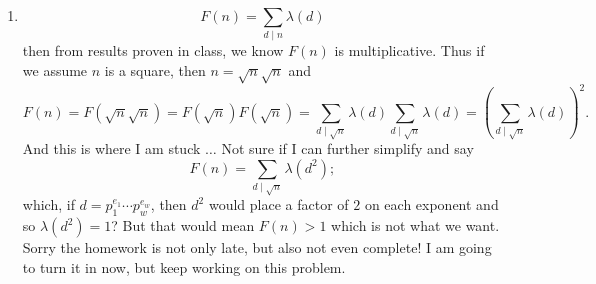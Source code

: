 \documentclass[12pt]{article}
\makeatletter
\theoremstyle{definition}
\theoremstyle{remark}
\renewenvironment{proof}[1][\proofname]{\par
  \pushQED{\qed}%
  \normalfont \topsep6\p@\@plus6\p@\relax
  \list{}{\leftmargin=0mm
          \rightmargin=4mm
          \settowidth{\itemindent}{\itshape#1}%
          \labelwidth=\itemindent
          \parsep=0pt \listparindent=\parindent 
  }
  \item[\hskip\labelsep
        \itshape
    #1\@addpunct{.}]\ignorespaces
}{%
  \popQED\endlist\@endpefalse
}
\let\oldproofname=\proofname
\renewcommand{\proofname}{\bf{\textit{\oldproofname}}}
\makeatother
\begin{document}
\begin{enumerate}[leftmargin=*]
\begin{proof}
\begin{equation*}
                        F(n)=\sum_{d\mid n}\lambda(d)
                    \end{equation*}
                then from results proven in class, we know $F(n)$ is multiplicative. Thus if we assume $n$ is a square, then $n=\sqrt{n}\sqrt{n}$ and
                    \begin{equation*}
                        F(n)=F(\sqrt{n}\sqrt{n})=F(\sqrt{n})F(\sqrt{n})=\sum_{d\mid \sqrt{n}}\lambda(d)\sum_{d\mid \sqrt{n}}\lambda(d)=\left(\sum_{d\mid \sqrt{n}}\lambda(d)\right)^2.
                    \end{equation*}
                And this is where I am stuck $\dots$ Not sure if I can further simplify and say
                    \begin{equation*}
                        F(n)=\sum_{d\mid\sqrt{n}}\lambda(d^2);
                    \end{equation*}
                which, if $d=p_1^{e_1}\cdots p_w^{e_w}$, then $d^2$ would place a factor of $2$ on each exponent and so $\lambda(d^2)=1$? But that would mean $F(n)>1$ which is not what we want. Sorry the homework is not only late, but also not even complete! I am going to turn it in now, but keep working on this problem.
            \end{proof}
    \end{enumerate}
\end{document}
